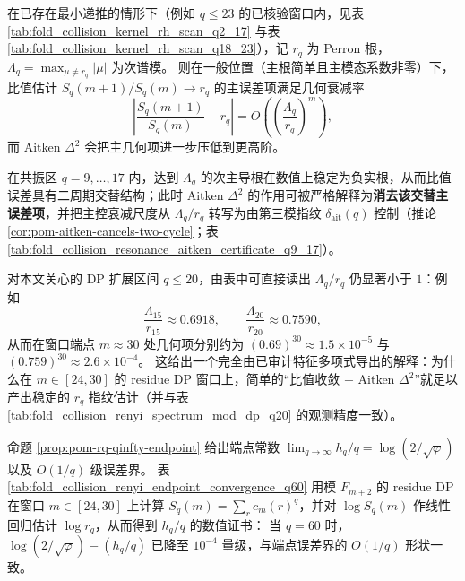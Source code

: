 \begin{remark}\label{rem:pom-dp-window-spectral-gap}
在已存在最小递推的情形下（例如 \(q\le 23\) 的已核验窗口内，见表 \ref{tab:fold_collision_kernel_rh_scan_q2_17} 与表 \ref{tab:fold_collision_kernel_rh_scan_q18_23}），记 \(r_q\) 为 Perron 根，\(\Lambda_q=\max_{\mu\ne r_q}|\mu|\) 为次谱模。
则在一般位置（主根简单且主模态系数非零）下，比值估计 \(S_q(m+1)/S_q(m)\to r_q\) 的主误差项满足几何衰减率
\[
\left|\frac{S_q(m+1)}{S_q(m)}-r_q\right|=O\!\left(\left(\frac{\Lambda_q}{r_q}\right)^{m}\right),
\]
而 Aitken \(\Delta^2\) 会把主几何项进一步压低到更高阶。
\par
在共振区 \(q=9,\dots,17\) 内，达到 \(\Lambda_q\) 的次主导根在数值上稳定为负实根，从而比值误差具有二周期交替结构；此时 Aitken \(\Delta^2\) 的作用可被严格解释为\textbf{消去该交替主误差项}，并把主控衰减尺度从 \(\Lambda_q/r_q\) 转写为由第三模指纹 \(\delta_{\mathrm{ait}}(q)\) 控制（推论 \ref{cor:pom-aitken-cancels-two-cycle}；表 \ref{tab:fold_collision_resonance_aitken_certificate_q9_17}）。
\par
对本文关心的 DP 扩展区间 \(q\le 20\)，由表中可直接读出 \(\Lambda_q/r_q\) 仍显著小于 \(1\)：例如
\[
\frac{\Lambda_{15}}{r_{15}}\approx 0.6918,\qquad
\frac{\Lambda_{20}}{r_{20}}\approx 0.7590,
\]
从而在窗口端点 \(m\approx 30\) 处几何项分别约为 \((0.69)^{30}\approx 1.5\times 10^{-5}\) 与 \((0.759)^{30}\approx 2.6\times 10^{-4}\)。
这给出一个完全由已审计特征多项式导出的解释：为什么在 \(m\in[24,30]\) 的 residue DP 窗口上，简单的“比值收敛 + Aitken \(\Delta^2\)”就足以产出稳定的 \(r_q\) 指纹估计（并与表 \ref{tab:fold_collision_renyi_spectrum_mod_dp_q20} 的观测精度一致）。
\end{remark}


\begin{remark}[端点收敛速度（可复核）：\texorpdfstring{$q\le 60$}{q<=60} 时 \texorpdfstring{$h_q/q\to\log(2/\sqrt{\varphi})$}{hq/q->log(2/sqrt(phi))}]\label{rem:pom-renyi-endpoint-q60}
命题 \ref{prop:pom-rq-qinfty-endpoint} 给出端点常数
\(
\lim_{q\to\infty}h_q/q=\log(2/\sqrt{\varphi})
\)
以及 \(O(1/q)\) 级误差界。
表 \ref{tab:fold_collision_renyi_endpoint_convergence_q60} 用模 \(F_{m+2}\) 的 residue DP 在窗口 \(m\in[24,30]\) 上计算 \(S_q(m)=\sum_r c_m(r)^q\)，并对 \(\log S_q(m)\) 作线性回归估计 \(\log r_q\)，从而得到 \(h_q/q\) 的数值证书：
当 \(q=60\) 时，\(\log(2/\sqrt{\varphi})-(h_q/q)\) 已降至 \(10^{-4}\) 量级，与端点误差界的 \(O(1/q)\) 形状一致。
\end{remark}


